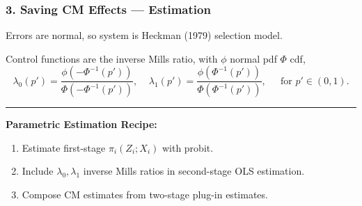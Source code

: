 \documentclass[dvipsnames]{beamer} %
\renewcommand{\vec}[1]{\boldsymbol{\mathit{#1}}}                           %
\newcommand{\E}[2][]{\mathbb{E}_{#1} \left[ #2 \right]}                    %
\renewcommand{\hat}[1]{\widehat{#1}}                                       %
\renewcommand{\bar}[1]{\overline{#1}}                                      %
\begin{document}
\begin{frame}
    \frametitle{3. Saving CM Effects --- Estimation}
    Errors are normal, so system is Heckman (1979) selection model.

    \vskip0.25cm

    Control functions are the inverse Mills ratio, with $\phi$ normal pdf $\Phi$ cdf, 
    \[ \lambda_0(p') =
        \frac{\phi( - \Phi^{-1}(p') )}{\Phi( -\Phi^{-1}(p') )}, \;\;\;\;
    \lambda_1(p') =
        \frac{\phi( \Phi^{-1}(p') )}{\Phi( \Phi^{-1}(p') )},
        \;\;\;\; \text{ for } p' \in (0,1). \]

    \par\noindent\rule{\textwidth}{0.4pt}
    \textbf{Parametric Estimation Recipe:}
    \begin{enumerate}
        \item Estimate first-stage $\pi_i(Z_i; \vec X_i)$ with probit.
        \item Include $\lambda_0, \lambda_1$ inverse Mills ratios in second-stage OLS estimation.
        \item Compose CM estimates from two-stage plug-in estimates.
    \end{enumerate}
    \vfill
    \makebox[\textwidth]{\parbox{1.25\textwidth}{
        \small
        \[ \hat{\text{ADE}}
            = \E{\hat\gamma + \hat\delta D_i}, \;\;
        \hat{\text{AIE}}
            = \mathbb E \Bigg[ \, \hat{\bar \pi} \,
                \Big( \hat\beta +  \hat\delta Z_i +
                    \underbrace{ (\hat\rho_1 - \hat\rho_0) \,
                    \Gamma \big(\hat\pi(0; \vec X_i), \, \hat\pi(1; \vec X_i) \big)}_{
                        \text{Mediator compliers extrapolation.}} \Big) \Bigg] \]
    }}
\end{frame}
\end{document}
